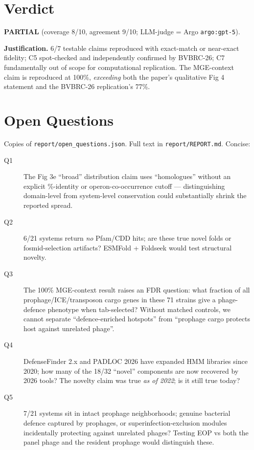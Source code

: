\documentclass[11pt]{article}
\begin{document}
\section{Verdict}
\textbf{PARTIAL} (coverage 8/10, agreement 9/10; LLM-judge = Argo \verb|argo:gpt-5|).

\textbf{Justification.} 6/7 testable claims reproduced with exact-match or near-exact fidelity; C5 spot-checked and independently confirmed by BVBRC-26; C7 fundamentally out of scope for computational replication. The MGE-context claim is reproduced at 100\%, \emph{exceeding} both the paper's qualitative Fig 4 statement and the BVBRC-26 replication's 77\%.

\section{Open Questions}
Copies of \verb|report/open_questions.json|. Full text in \verb|report/REPORT.md|. Concise:
\begin{description}
  \item[Q1] The Fig 3e ``broad'' distribution claim uses ``homologues'' without an explicit \%-identity or operon-co-occurrence cutoff --- distinguishing domain-level from system-level conservation could substantially shrink the reported spread.
  \item[Q2] 6/21 systems return \emph{no} Pfam/CDD hits; are these true novel folds or fosmid-selection artifacts? ESMFold + Foldseek would test structural novelty.
  \item[Q3] The 100\% MGE-context result raises an FDR question: what fraction of all prophage/ICE/transposon cargo genes in these 71 strains give a phage-defence phenotype when tab-selected? Without matched controls, we cannot separate ``defence-enriched hotspots'' from ``prophage cargo protects host against unrelated phage''.
  \item[Q4] DefenseFinder 2.x and PADLOC 2026 have expanded HMM libraries since 2020; how many of the 18/32 ``novel'' components are now recovered by 2026 tools? The novelty claim was true \emph{as of 2022}; is it still true today?
  \item[Q5] 7/21 systems sit in intact prophage neighborhoods; genuine bacterial defence captured by prophages, or superinfection-exclusion modules incidentally protecting against unrelated phages? Testing EOP vs both the panel phage and the resident prophage would distinguish these.
\end{description}
\end{document}
